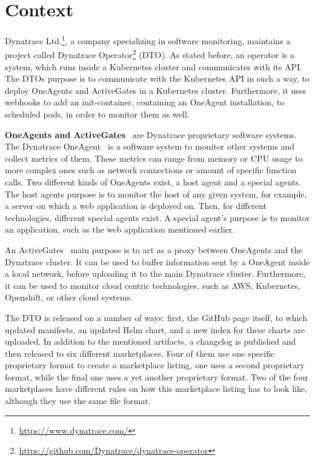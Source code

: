 \chapter{Context}\label{ch:context}

Dynatrace Ltd.\footnote{\url{https://www.dynatrace.com/}}, a company specializing in software monitoring, maintains a project called Dynatrace Operator\footnote{\url{https://github.com/Dynatrace/dynatrace-operator}} (DTO).
As stated before, an operator is a system, which runs inside a Kubernetes cluster and communicates with its API.
The DTOs purpose is to communicate with the Kubernetes API in such a way, to deploy OneAgents and ActiveGates in a Kubernetes cluster.
Furthermore, it uses webhooks to add an init-container, containing an OneAgent installation, to scheduled pods, in order to monitor them as well.

\textbf{OneAgents and ActiveGates}~\cite{oneagents,activegates} are Dynatrace proprietary software systems.
The Dynatrace OneAgent~\cite{oneagents} is a software system to monitor other systems and collect metrics of them.
These metrics can range from memory or CPU usage to more complex ones such as network connections or amount of specific function calls.
Two different kinds of OneAgents exist, a host agent and a special agents.
The host agents purpose is to monitor the host of any given system, for example, a server on which a web application is deployed on.
Then, for different technologies, different special agents exist.
A special agent's purpose is to monitor an application, such as the web application mentioned earlier.

An ActiveGates~\cite{activegates} main purpose is to act as a proxy between OneAgents and the Dynatrace cluster.
It can be used to buffer information sent by a OneAgent inside a local network, before uploading it to the main Dynatrace cluster.
Furthermore, it can be used to monitor cloud centric technologies, such as AWS, Kubernetes, Openshift, or other cloud systems.

\pagebreak

The DTO is released on a number of ways:
first, the GitHub page itself, to which updated manifests, an updated Helm chart, and a new index for these charts are uploaded.
In addition to the mentioned artifacts, a changelog is published and then released to six different marketplaces.
Four of them use one specific proprietary format to create a marketplace listing, one uses a second proprietary format, while the final one uses a yet another proprietary format.
Two of the four marketplaces have different rules on how this marketplace listing has to look like, although they use the same file format.

